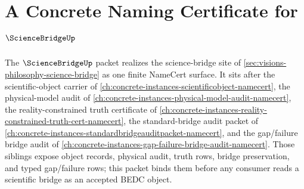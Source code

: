\chapter{A Concrete Naming Certificate for $\ScienceBridgeUp$}
\label{ch:concrete-instances-sciencebridge-namecert}

The $\ScienceBridgeUp$ packet realizes the science-bridge site of \autoref{sec:visions-philosophy-science-bridge} as one finite NameCert surface. It sits after the scientific-object carrier of \autoref{ch:concrete-instances-scientificobject-namecert}, the physical-model audit of \autoref{ch:concrete-instances-physical-model-audit-namecert}, the reality-constrained truth certificate of \autoref{ch:concrete-instances-reality-constrained-truth-cert-namecert}, the standard-bridge audit packet of \autoref{ch:concrete-instances-standardbridgeauditpacket-namecert}, and the gap/failure bridge audit of \autoref{ch:concrete-instances-gap-failure-bridge-audit-namecert}. Those siblings expose object records, physical audit, truth rows, bridge preservation, and typed gap/failure rows; this packet binds them before any consumer reads a scientific bridge as an accepted BEDC object.

